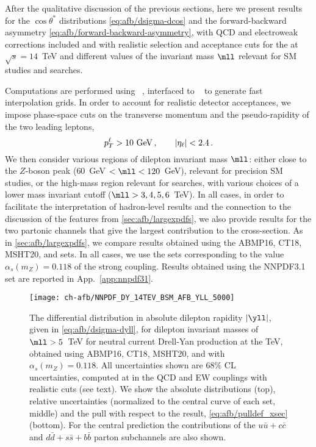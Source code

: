 
After the qualitative discussion of the previous sections, here we
present results for the $\cos\theta^*$
distributions \cref{eq:afb/dsigma-dcos} and the
forward-backward asymmetry \cref{eq:afb/forward-backward-asymmetry}, with
\nlo QCD and electroweak corrections included and
with realistic selection and acceptance cuts for the \lhc at $\sqrt{s} = 14$~TeV
and different values of the invariant mass $\mll$ relevant for SM
studies and \bsm searches.

Computations are performed using \mgamc~\cite{Alwall:2014hca},
interfaced to \pineappl~\cite{Carrazza:2020gss,christopher_schwan_2022_7023438} to generate
fast interpolation grids.
%
In order to account for realistic detector acceptances,
we impose phase-space cuts on the transverse momentum and the pseudo-rapidity of the two
leading leptons,
\begin{equation}
p_T^{\ell} > 10~{\rm GeV}  \, ,\qquad |\eta_{\ell}| < 2.4 \,.
\end{equation}
We then consider various regions of dilepton invariant mass $\mll$:
either close to the $Z$-boson peak ($60$~GeV $< \mll < 120$~GeV),
relevant for precision SM studies, or the
high-mass region relevant for \bsm searches, with  various choices of a
lower mass invariant cutoff ($\mll > 3,4,5,6$~TeV).
%
In all cases, in order to facilitate the interpretation of
hadron-level results  and the connection to
the discussion of the \pdf features from \cref{sec:afb/largexpdfs},
we also provide results for the two partonic channels that give the
largest contribution to the cross-section.
%
As in \cref{sec:afb/largexpdfs}, we compare results obtained using
the  ABMP16, CT18, MSHT20, and  \pdf sets.
%
In all cases, we
use the  \nnlo sets corresponding to the value $\alpha_s(m_Z)=0.118$
of the strong coupling.
%
Results obtained using the NNPDF3.1 \pdf set are reported in App.~\ref{app:nnpdf31}.

\begin{figure}[!t]
 \centering
 \texttt{[image: ch-afb/NNPDF\_DY\_14TEV\_BSM\_AFB\_YLL\_5000]}
 \caption{The differential distribution in absolute dilepton rapidity $|\yll|$, given in
\cref{eq:afb/dsigma-dyll},
for dilepton invariant masses of $\mll > 5$~TeV
for neutral current Drell-Yan production at the
 TeV,
obtained using ABMP16, CT18, MSHT20, and  \nnlo \pdfs with $\alpha_s(m_Z)=0.118$.
%
All
uncertainties shown are 68\% CL \pdf uncertainties, computed at \nlo
in the QCD and EW couplings with realistic cuts (see text).
We show the absolute distributions (top), relative uncertainties (normalized
to the central curve of each set, middle) and the pull with respect to the
 result, \cref{eq:afb/pulldef_xsec} (bottom).
%
For the central  prediction
the contributions of the $u\bar{u}+c\bar{c}$ and $d\bar{d}+s\bar{s}+b\bar{b}$
parton subchannels are also shown.
 \label{fig:afb/CMS_DY_14TEV_MLL_5000_rap}}
\end{figure}

